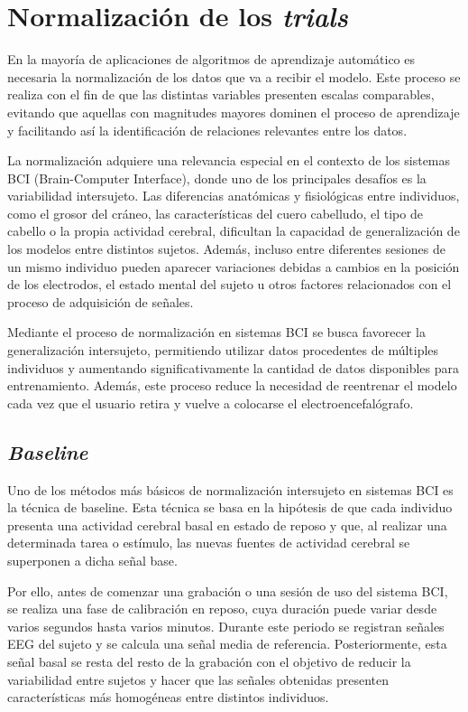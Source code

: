 \section{Normalización de los \textit{trials}}
\label{sec:normalizacion}

En la mayoría de aplicaciones de algoritmos de aprendizaje automático es necesaria la normalización de los datos que va a recibir el modelo. Este proceso se realiza con el fin de que las distintas variables presenten escalas comparables, evitando que aquellas con magnitudes mayores dominen el proceso de aprendizaje y facilitando así la identificación de relaciones relevantes entre los datos.

La normalización adquiere una relevancia especial en el contexto de los sistemas BCI (Brain-Computer Interface), donde uno de los principales desafíos es la variabilidad intersujeto. Las diferencias anatómicas y fisiológicas entre individuos, como el grosor del cráneo, las características del cuero cabelludo, el tipo de cabello o la propia actividad cerebral, dificultan la capacidad de generalización de los modelos entre distintos sujetos. Además, incluso entre diferentes sesiones de un mismo individuo pueden aparecer variaciones debidas a cambios en la posición de los electrodos, el estado mental del sujeto u otros factores relacionados con el proceso de adquisición de señales.

Mediante el proceso de normalización en sistemas BCI se busca favorecer la generalización intersujeto, permitiendo utilizar datos procedentes de múltiples individuos y aumentando significativamente la cantidad de datos disponibles para entrenamiento. Además, este proceso reduce la necesidad de reentrenar el modelo cada vez que el usuario retira y vuelve a colocarse el electroencefalógrafo.

\subsection{\textit{Baseline}}
\label{subsec:baseline}

Uno de los métodos más básicos de normalización intersujeto en sistemas BCI es la técnica de baseline. Esta técnica se basa en la hipótesis de que cada individuo presenta una actividad cerebral basal en estado de reposo y que, al realizar una determinada tarea o estímulo, las nuevas fuentes de actividad cerebral se superponen a dicha señal base.

Por ello, antes de comenzar una grabación o una sesión de uso del sistema BCI, se realiza una fase de calibración en reposo, cuya duración puede variar desde varios segundos hasta varios minutos. Durante este periodo se registran señales EEG del sujeto y se calcula una señal media de referencia. Posteriormente, esta señal basal se resta del resto de la grabación con el objetivo de reducir la variabilidad entre sujetos y hacer que las señales obtenidas presenten características más homogéneas entre distintos individuos.

